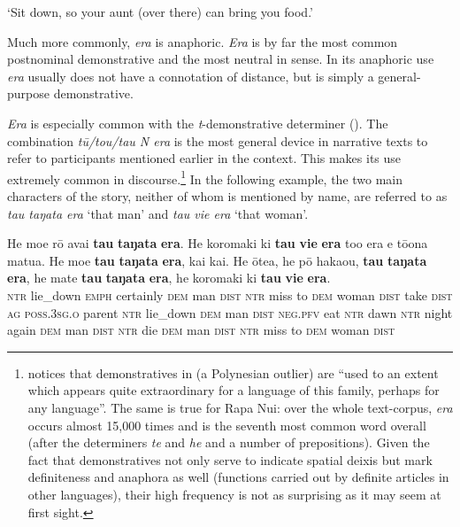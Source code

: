 \glt
‘Sit down, so your aunt (over there) can bring you food.’ \textstyleExampleref{[R245.065]} 
\z

Much more commonly, \textit{era} is anaphoric. \textit{Era} is by far the most common postnominal demonstrative and the most neutral in sense. In its anaphoric use \textit{era} usually does not have a connotation of distance, but is simply a general-purpose demonstrative. 

\textit{Era} is especially common with the \textit{t}{}-demonstrative determiner (). The combination \textit{tū}\textit{/tou/tau N era} is the most general device in narrative texts to refer to participants mentioned earlier in the context. This makes its use extremely common in discourse.\footnote{\label{fn:217}\citet[81]{Naess2004} notices that demonstratives in  (a Polynesian outlier) are “used to an extent which appears quite extraordinary for a language of this family, perhaps for any language”. The same is true for Rapa Nui: over the whole text-corpus, \textit{era} occurs almost 15,000 times and is the seventh most common word overall (after the determiners \textit{te} and \textit{he} and a number of prepositions). Given the fact that demonstratives not only serve to indicate spatial deixis but mark definiteness and anaphora as well (functions carried out by definite articles in other languages), their high frequency is not as surprising as it may seem at first sight.} In the following example, the two main characters of the story, neither of whom is mentioned by name, are referred to as \textit{tau taŋata era} ‘that man’ and \textit{tau vi{\ꞌ}e era} ‘that woman’.

\ea\label{ex:4.199}
\gll He moe rō {\ꞌ}avai \textbf{tau} \textbf{taŋata} \textbf{era}. He koromaki ki \textbf{tau} \textbf{vi{\ꞌ}e} \textbf{era}  to{\ꞌ}o era e tō{\ꞌ}ona matu{\ꞌ}a. He moe \textbf{tau} \textbf{taŋata} \textbf{era}, kai kai. He {\ꞌ}ōtea, he pō haka{\ꞌ}ou, \textbf{tau} \textbf{taŋata} \textbf{era}, he mate \textbf{tau} \textbf{taŋata} \textbf{era}, he koromaki ki \textbf{tau} \textbf{vi{\ꞌ}e} \textbf{era}.\\
\textsc{ntr} lie\_down \textsc{emph} certainly \textsc{dem} man \textsc{dist} \textsc{ntr} miss to \textsc{dem} woman \textsc{dist}  take \textsc{dist} \textsc{ag} \textsc{poss.3sg.o} parent \textsc{ntr} lie\_down \textsc{dem} man \textsc{dist} \textsc{neg.pfv} eat \textsc{ntr} dawn \textsc{ntr} night again \textsc{dem} man \textsc{dist} \textsc{ntr} die \textsc{dem} man \textsc{dist} \textsc{ntr} miss to \textsc{dem} woman \textsc{dist}\\

